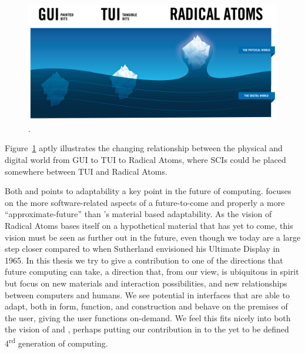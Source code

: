 \begin{figure}[h]
  \centering
      \includegraphics[width=\linewidth]{figures/radicalatoms}
  \caption{.}
   \label{radicalatoms}
\end{figure}

Figure~\ref{radicalatoms} aptly illustrates the changing relationship between the physical and digital world from GUI to TUI to Radical Atoms, where SCIs could be placed somewhere between TUI and Radical Atoms.

Both \citeauthor{ishii2012radical} and \citeauthor{abowd2012next} points to adaptability a key point in the future of computing.
\citeauthor{abowd2012next} focuses on the more software-related aspects of a future-to-come and properly a more ``approximate-future'' than \citeauthor{ishii2012radical}'s material based adaptability.
As the vision of Radical Atoms bases itself on a hypothetical material that has yet to come, this vision must be seen as further out in the future, even though we today are a large step closer compared to when Sutherland envisioned his Ultimate Display in 1965. 
\blank
In this thesis we try to give a contribution to one of the directions that future computing can take, a direction that, from our view, is ubiquitous in spirit but focus on new materials and interaction possibilities, and new relationships between computers and humans.
We see potential in interfaces that are able to adapt, both in form, function, and construction and behave on the premises of the user, giving the user functions on-demand.
We feel this fits nicely into both the vision of \citeauthor{abowd2012next} and \citeauthor{ishii2012radical}, perhaps putting our contribution in to the yet to be defined 4\textsuperscript{rd} generation of computing.
